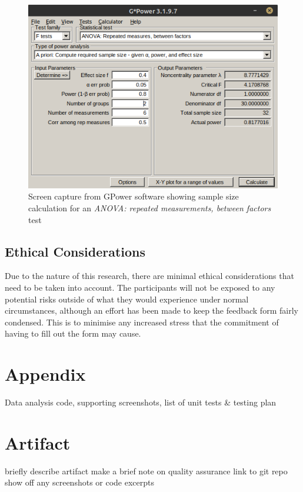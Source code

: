 \documentclass[lettersize,journal]{IEEEtran}
\begin{document}
        \begin{figure}[h!]
            \includegraphics[width=\columnwidth]{Images/ANOVA_2.png}
            \caption{Screen capture from GPower software showing sample size calculation for an \textit{ANOVA: repeated measurements, between factors} test}
            \label{ANOVArepeatedbetween}
        \end{figure}

    \subsection{Ethical Considerations}
        Due to the nature of this research, there are minimal ethical considerations that need to be taken into account. The participants will not be exposed to any potential risks outside of what they would experience under normal circumstances, although an effort has been made to keep the feedback form fairly condensed. This is to minimise any increased stress that the commitment of having to fill out the form may cause.
    
\section{Appendix}
    Data analysis code, supporting screenshots, list of unit tests \& testing plan

\section{Artifact}
    briefly describe artifact
    make a brief note on quality assurance
    link to git repo
    show off any screenshots or code excerpts
\end{document}
